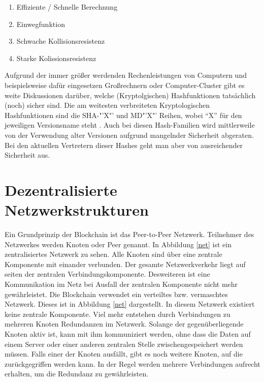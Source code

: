 \begin{enumerate}
\item{Effiziente / Schnelle Berechnung}
\item{Einwegfunktion}
\item{Schwache Kollisionsresistenz}
\item{Starke Kolissionsresistenz}
\end{enumerate}
		
		Aufgrund der immer größer werdenden Rechenleistungen von Computern und beispielsweise dafür eingesetzen Großrechnern oder Computer-Cluster gibt es weite Diskussionen darüber, welche (Kryptolgischen) Hashfunktionen tatsächlich (noch) sicher sind. Die am weitesten verbreiteten Kryptologischen Hashfunktionen sind die SHA-"'X"' und MD"'X"' Reihen, wobei "`X"' für den jeweiligen Versionsname steht \cite{shamd}. Auch bei diesen Hash-Familien wird mittlerweile von der Verwendung alter Versionen aufgrund mangelnder Sicherheit abgeraten. Bei den aktuellen Vertretern dieser Hashes geht man aber von ausreichender Sicherheit aus.
		
	\section{\label{subsec:p2p}Dezentralisierte Netzwerkstrukturen}
	
		Ein Grundprinzip der Blockchain ist das Peer-to-Peer Netzwerk. Teilnehmer des Netzwerkes werden Knoten oder Peer genannt. In Abbildung \ref{net} ist ein zentralisiertes Netzwerk zu sehen. Alle Knoten sind über eine zentrale Komponente mit einander verbunden. Der gesamte Netzwerkverkehr liegt auf seiten der zentralen Verbindungskomponente. Desweiteren ist eine Kommunikation im Netz bei Ausfall der zentralen Komponente nicht mehr gewährleistet. 
Die Blockchain verwendet ein verteiltes bzw. vermaschtes Netzwerk. Dieses ist in Abbildung \ref{net} dargestellt. In diesem Netzwerk existiert keine zentrale Komponente. Viel mehr entstehen durch Verbindungen zu mehreren Knoten Redundanzen im Netzwerk. Solange der gegenüberliegende Knoten aktiv ist, kann mit ihm kommuniziert werden, ohne dass die Daten auf einem Server oder einer anderen zentralen Stelle zwischengespeichert werden müssen. Falls einer der Knoten ausfällt, gibt es noch weitere Knoten, auf die zurückgegriffen werden kann. In der Regel werden mehrere Verbindungen aufrecht erhalten, um die Redundanz zu gewährleisten. 
		
